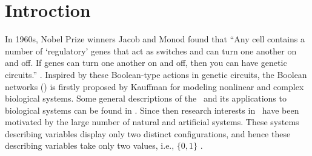 \section{Introction}
\label{sec:intro}
In 1960s, Nobel Prize winners Jacob and Monod found that  ``Any cell contains a number of `regulatory' genes that act as switches and can turn one another on and off. If genes can turn one another on and off, then you can have genetic circuits.'' \cite{Jacob1961Genetic}. Inspired by these Boolean-type actions in genetic circuits, the Boolean networks (\BNs) is firstly proposed by Kauffman \cite{Kauffman1968Metabolic} for modeling nonlinear and complex biological systems. Some general descriptions of the \BNs\ and its applications to biological systems can be found in \cite{Kauffman1968Metabolic}. Since then research interests in  \BNs\ have been motivated by the large number of natural and artificial systems. These systems describing variables display only two distinct configurations, and hence these describing variables take only two values, i.e., $\{0,1\}$  \cite{Akutsu2000Inferring, Shmulevich2002From, Faur2006Dynamical,Green2007The,Lou2010Multi,Fornasini2013Observability}.


